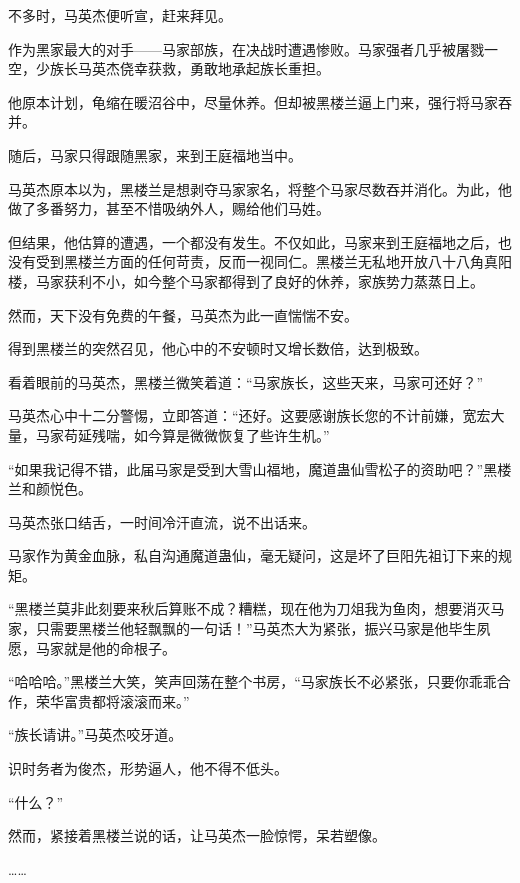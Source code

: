 
\begin{this_body}

不多时，马英杰便听宣，赶来拜见。

作为黑家最大的对手——马家部族，在决战时遭遇惨败。马家强者几乎被屠戮一空，少族长马英杰侥幸获救，勇敢地承起族长重担。

他原本计划，龟缩在暖沼谷中，尽量休养。但却被黑楼兰逼上门来，强行将马家吞并。

随后，马家只得跟随黑家，来到王庭福地当中。

马英杰原本以为，黑楼兰是想剥夺马家家名，将整个马家尽数吞并消化。为此，他做了多番努力，甚至不惜吸纳外人，赐给他们马姓。

但结果，他估算的遭遇，一个都没有发生。不仅如此，马家来到王庭福地之后，也没有受到黑楼兰方面的任何苛责，反而一视同仁。黑楼兰无私地开放八十八角真阳楼，马家获利不小，如今整个马家都得到了良好的休养，家族势力蒸蒸日上。

然而，天下没有免费的午餐，马英杰为此一直惴惴不安。

得到黑楼兰的突然召见，他心中的不安顿时又增长数倍，达到极致。

看着眼前的马英杰，黑楼兰微笑着道：“马家族长，这些天来，马家可还好？”

马英杰心中十二分警惕，立即答道：“还好。这要感谢族长您的不计前嫌，宽宏大量，马家苟延残喘，如今算是微微恢复了些许生机。”

“如果我记得不错，此届马家是受到大雪山福地，魔道蛊仙雪松子的资助吧？”黑楼兰和颜悦色。

马英杰张口结舌，一时间冷汗直流，说不出话来。

马家作为黄金血脉，私自沟通魔道蛊仙，毫无疑问，这是坏了巨阳先祖订下来的规矩。

“黑楼兰莫非此刻要来秋后算账不成？糟糕，现在他为刀俎我为鱼肉，想要消灭马家，只需要黑楼兰他轻飘飘的一句话！”马英杰大为紧张，振兴马家是他毕生夙愿，马家就是他的命根子。

“哈哈哈。”黑楼兰大笑，笑声回荡在整个书房，“马家族长不必紧张，只要你乖乖合作，荣华富贵都将滚滚而来。”

“族长请讲。”马英杰咬牙道。

识时务者为俊杰，形势逼人，他不得不低头。

“什么？”

然而，紧接着黑楼兰说的话，让马英杰一脸惊愕，呆若塑像。

……


\end{this_body}
